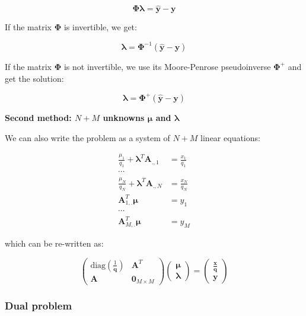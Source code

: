 \documentclass{tex/note}
\begin{document}
\begin{equation*}
\bm{\Phi} \bm{\lambda} = \hat{\bm{y}} - \bm{y}
\end{equation*}

If the matrix $\bm{\Phi}$ is invertible, we get:

\begin{equation*}
\bm{\lambda} = \bm{\Phi} ^{-1} \left( \hat{\bm{y}} - \bm{y} \right)
\end{equation*}

If the matrix $\bm{\Phi}$ is not invertible, we use its Moore-Penrose pseudoinverse $\bm{\Phi}^+$ and get the solution:

\begin{equation*}
\bm{\lambda} = \bm{\Phi} ^+ \left( \hat{\bm{y}} - \bm{y} \right)
\end{equation*}

\textbf{Second method: $N + M$ unknowns $\bm{\mu}$ and $\bm{\lambda}$}

We can also write the problem as a system of $N + M$ linear equations:

\begin{align*}
\frac{\mu_1}{q_1} + \bm{\lambda}^T \bm{A}_{.,1} &= \frac{x_1}{q_1} \\
\cdots & \\
\frac{\mu_N}{q_N} + \bm{\lambda}^T \bm{A}_{.,N} &= \frac{x_N}{q_N} \\
\bm{A}_{1,.}^T \bm{\mu} &= y_1 \\
\cdots & \\
\bm{A}_{M,.}^T \bm{\mu} &= y_M
\end{align*}

which can be re-written as:

\begin{equation*}
\begin{pmatrix} \text{diag} \left( \frac{1}{\bm{q}} \right) & \bm{A}^T \\ \bm{A} & \bm{0}_{M \times M} \end{pmatrix} \begin{pmatrix} \bm{\mu} \\ \bm{\lambda} \end{pmatrix} = \begin{pmatrix} \frac{\bm{x}}{\bm{q}} \\ \bm{y} \end{pmatrix}
\end{equation*}

\subsubsection{Dual problem}
\end{document}

